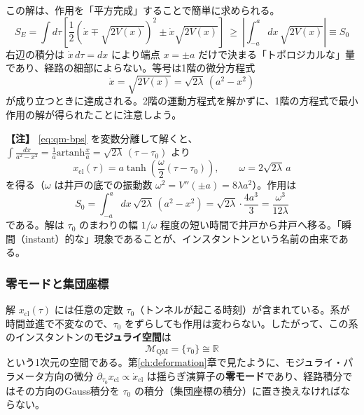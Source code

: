 \documentclass[uplatex, dvipdfmx, book]{jsbook}
\let\origsubsubsection\subsubsection
\renewcommand{\subsection}{\origsubsubsection}
\renewcommand{\subsubsection}{\paragraph}
\newenvironment{note}{\vspace{1ex}\par\footnotesize\noindent\textbf{【注】}}{\par\vspace{1ex}}
\begin{document}
この解は、作用を「平方完成」することで簡単に求められる。
\begin{equation}
    S_E = \int d\tau \left[ \frac{1}{2}\left( \dot{x} \mp \sqrt{2V(x)} \right)^2 \pm \dot{x}\sqrt{2V(x)} \right] \ \ge\ \left| \int_{-a}^{a} dx\, \sqrt{2V(x)} \right| \equiv S_0
\end{equation}
右辺の積分は $\dot{x}\,d\tau = dx$ により端点 $x = \pm a$ だけで決まる「トポロジカルな」量であり、経路の細部によらない。等号は1階の微分方程式
\begin{equation}
    \dot{x} = \sqrt{2V(x)} = \sqrt{2\lambda}\,(a^2 - x^2)
    \label{eq:qm-bps}
\end{equation}
が成り立つときに達成される。2階の運動方程式を解かずに、1階の方程式で最小作用の解が得られたことに注意しよう。

\begin{note}
\eqref{eq:qm-bps} を変数分離して解くと、$\int \frac{dx}{a^2 - x^2} = \frac{1}{a}\mathrm{artanh}\frac{x}{a} = \sqrt{2\lambda}\,(\tau - \tau_0)$ より
\begin{equation*}
    x_{\text{cl}}(\tau) = a \tanh\left( \frac{\omega}{2}(\tau - \tau_0) \right), \qquad \omega = 2\sqrt{2\lambda}\,a
\end{equation*}
を得る（$\omega$ は井戸の底での振動数 $\omega^2 = V''(\pm a) = 8\lambda a^2$）。作用は
\begin{equation*}
    S_0 = \int_{-a}^{a} dx\, \sqrt{2\lambda}\,(a^2 - x^2) = \sqrt{2\lambda} \cdot \frac{4a^3}{3} = \frac{\omega^3}{12\lambda}
\end{equation*}
である。解は $\tau_0$ のまわりの幅 $1/\omega$ 程度の短い時間で井戸から井戸へ移る。「瞬間（instant）的な」現象であることが、インスタントンという名前の由来である。
\end{note}

\subsection{零モードと集団座標}

解 $x_{\text{cl}}(\tau)$ には任意の定数 $\tau_0$（トンネルが起こる時刻）が含まれている。系が時間並進で不変なので、$\tau_0$ をずらしても作用は変わらない。したがって、この系のインスタントンの\textbf{モジュライ空間}は
\begin{equation}
    \mathcal{M}_{\text{QM}} = \{ \tau_0 \} \cong \mathbb{R}
\end{equation}
という1次元の空間である。第\ref{ch:deformation}章で見たように、モジュライ・パラメータ方向の微分 $\partial_{\tau_0}x_{\text{cl}} \propto \dot{x}_{\text{cl}}$ は揺らぎ演算子の\textbf{零モード}であり、経路積分ではその方向のGauss積分を $\tau_0$ の積分（集団座標の積分）に置き換えなければならない。
\end{document}
